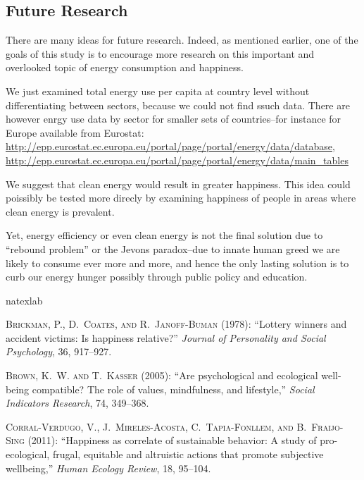 \documentclass[10pt, letterpaper]{article}
\begin{document}
\begin{spacing}{1.4}
\section{Future Research}

There are many ideas for future research. Indeed, as mentioned earlier, one of
the goals of this study is to encourage more research on this important and
overlooked topic of energy consumption and happiness.

We just examined total energy use per capita at country level without
differentiating between sectors, because we could not find ssuch data. There are
however enrgy use data by sector for smaller sets of countries--for instance for
Europe available from Eurostat: 
\url{http://epp.eurostat.ec.europa.eu/portal/page/portal/energy/data/database}, \url{http://epp.eurostat.ec.europa.eu/portal/page/portal/energy/data/main_tables} 

We suggest that clean energy would result in greater happiness. This idea could
poissibly be tested more direcly by examining happiness of people in areas where
clean energy is prevalent. 


Yet, energy efficiency or even clean energy is not the final solution due to
``rebound problem'' or the Jevons paradox--due to innate human greed we are
likely to consume ever more and more, and hence the only lasting solution is to
curb our energy hunger possibly through public policy and education.

\newpage
%

\begin{thebibliography}{36}
\newcommand{\enquote}[1]{``#1''}
\expandafter\ifx\csname natexlab\endcsname\relax\def\natexlab#1{#1}\fi

\textsc{Brickman, P., D.~Coates, and R.~Janoff-Buman} (1978): \enquote{Lottery
  winners and accident victims: Is happiness relative?} \emph{Journal of
  Personality and Social Psychology}, 36, 917--927.

\textsc{Brown, K.~W. and T.~Kasser} (2005): \enquote{Are psychological and
  ecological well-being compatible? The role of values, mindfulness, and
  lifestyle,} \emph{Social Indicators Research}, 74, 349--368.

\textsc{Corral-Verdugo, V., J.~Mireles-Acosta, C.~Tapia-Fonllem, and
  B.~Fraijo-Sing} (2011): \enquote{Happiness as correlate of sustainable
  behavior: A study of pro-ecological, frugal, equitable and altruistic actions
  that promote subjective wellbeing,} \emph{Human Ecology Review}, 18, 95--104.


\end{thebibliography}
\end{spacing}
\end{document}
